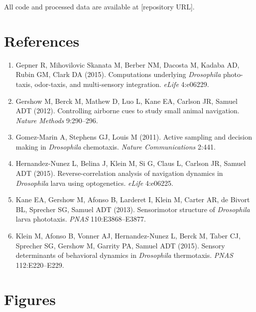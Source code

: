 \documentclass[
  11pt,
  letterpaper,
]{article}
\begin{document}
All code and processed data are available at {[}repository URL{]}.

\section*{References}

\begin{enumerate}
\item Gepner R, Mihovilovic Skanata M, Berber NM, Dacosta M, Kadaba AD, Rubin GM, Clark DA (2015). Computations underlying \textit{Drosophila} photo-taxis, odor-taxis, and multi-sensory integration. \textit{eLife} 4:e06229.

\item Gershow M, Berck M, Mathew D, Luo L, Kane EA, Carlson JR, Samuel ADT (2012). Controlling airborne cues to study small animal navigation. \textit{Nature Methods} 9:290--296.

\item Gomez-Marin A, Stephens GJ, Louis M (2011). Active sampling and decision making in \textit{Drosophila} chemotaxis. \textit{Nature Communications} 2:441.

\item Hernandez-Nunez L, Belina J, Klein M, Si G, Claus L, Carlson JR, Samuel ADT (2015). Reverse-correlation analysis of navigation dynamics in \textit{Drosophila} larva using optogenetics. \textit{eLife} 4:e06225.

\item Kane EA, Gershow M, Afonso B, Larderet I, Klein M, Carter AR, de Bivort BL, Sprecher SG, Samuel ADT (2013). Sensorimotor structure of \textit{Drosophila} larva phototaxis. \textit{PNAS} 110:E3868--E3877.

\item Klein M, Afonso B, Vonner AJ, Hernandez-Nunez L, Berck M, Taber CJ, Sprecher SG, Gershow M, Garrity PA, Samuel ADT (2015). Sensory determinants of behavioral dynamics in \textit{Drosophila} thermotaxis. \textit{PNAS} 112:E220--E229.
\end{enumerate}

\newpage
\section*{Figures}
\end{document}
